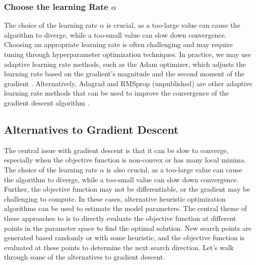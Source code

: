 \documentclass{article}[12pt]
\begin{document}
\subsubsection*{Choose the learning Rate $\alpha$}
The choice of the learning rate $\alpha$ is crucial, as a too-large value can cause the algorithm to diverge, while a too-small value can slow down convergence.
Choosing an appropriate learning rate is often challenging and may require tuning through hyperparameter optimization techniques. 
In practice, we may use adaptive learning rate methods, such as the Adam optimizer, which adjusts the learning rate based on the gradient's magnitude and the second moment of the gradient \cite{ADAM-2014}.
Alternatively, Adagrad and RMSprop (unpublished) are other adaptive learning rate methods that can be used to improve the convergence of the gradient descent algorithm \cite{ADAGrad2011}.


\subsection{Alternatives to Gradient Descent}
The central issue with gradient descent is that it can be slow to converge, especially when the objective function is non-convex or has many local minima.
The choice of the learning rate $\alpha$ is also crucial, as a too-large value can cause the algorithm to diverge, while a too-small value can slow down convergence.
Further, the objective function may not be differentiable, or the gradient may be challenging to compute.
In these cases, alternative heuristic optimization algorithms can be used to estimate the model parameters.
The central theme of these approaches to is to directly evaluate the objective function at different points in the parameter space to find the optimal solution.
New search points are generated based randomly or with some heuristic, and the objective function is evaluated at these points to determine the next search direction.
Let's walk through some of the alternatives to gradient descent.
\end{document}
